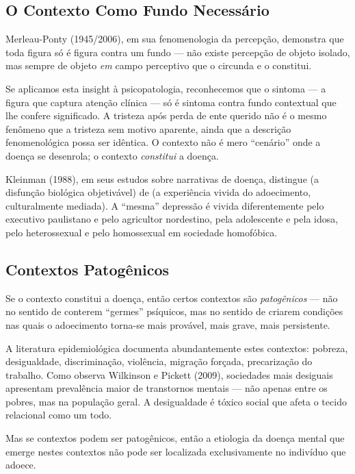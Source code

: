 \subsection{O Contexto Como Fundo Necessário}

Merleau-Ponty (1945/2006), em sua fenomenologia da percepção, demonstra que toda figura só é figura contra um fundo --- não existe percepção de objeto isolado, mas sempre de objeto \textit{em} campo perceptivo que o circunda e o constitui.

Se aplicamos esta insight à psicopatologia, reconhecemos que o sintoma --- a figura que captura atenção clínica --- só é sintoma contra fundo contextual que lhe confere significado. A tristeza após perda de ente querido não é o mesmo fenômeno que a tristeza sem motivo aparente, ainda que a descrição fenomenológica possa ser idêntica. O contexto não é mero \enquote{cenário} onde a doença se desenrola; o contexto \textit{constitui} a doença.

Kleinman (1988), em seus estudos sobre narrativas de doença, distingue  (a disfunção biológica objetivável) de  (a experiência vivida do adoecimento, culturalmente mediada). A \enquote{mesma} depressão é vivida diferentemente pelo executivo paulistano e pelo agricultor nordestino, pela adolescente e pela idosa, pelo heterossexual e pelo homossexual em sociedade homofóbica.

\subsection{Contextos Patogênicos}

Se o contexto constitui a doença, então certos contextos são \textit{patogênicos} --- não no sentido de conterem \enquote{germes} psíquicos, mas no sentido de criarem condições nas quais o adoecimento torna-se mais provável, mais grave, mais persistente.

A literatura epidemiológica documenta abundantemente estes contextos: pobreza, desigualdade, discriminação, violência, migração forçada, precarização do trabalho. Como observa Wilkinson e Pickett (2009), sociedades mais desiguais apresentam prevalência maior de transtornos mentais --- não apenas entre os pobres, mas na população geral. A desigualdade é tóxico social que afeta o tecido relacional como um todo.

Mas se contextos podem ser patogênicos, então a etiologia da doença mental que emerge nestes contextos não pode ser localizada exclusivamente no indivíduo que adoece.

